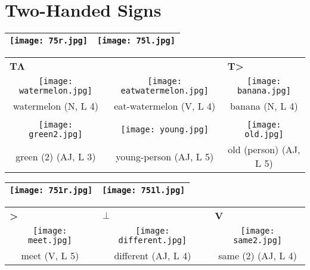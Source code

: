 \documentclass{tufte-book}
\newcommand{\sansnormal}{\sffamily\selectfont}
\begin{document}
\begin{fullwidth}
\begin{table}[h!]
\begin{tabular}{!{\vrule width 3pt}l | l| c!{\vrule width 3pt} l | l| c!{\vrule width 3pt} l|l|c!{\vrule width 3pt}}
\end{tabular}
\end{table}


\newpage
\section{Two-Handed Signs}
\label{page:begintwohand}%

\begin{table}[h!]
\begin{tabular}{|c|c|}
\hline
\texttt{[image: 75r.jpg]} & \texttt{[image: 75l.jpg]}\\
\hline
\end{tabular}
\label{page:75}
\end{table}

 \begin{table*}[h!]
\begin{tabular}{ccc}
 \multicolumn{1}{l}{\textbf{\sansnormal T}$\mathbf\Lambda$}&&\multicolumn{1}{l}{\textbf{{\sansnormal T}>}}  \\
   \texttt{[image: watermelon.jpg]}& \texttt{[image: eatwatermelon.jpg]}&  \texttt{[image: banana.jpg]}\\
   watermelon (N, L 4) & eat-watermelon (V, L 4)& banana (N, L 4)\\%
   \multicolumn{3}{l}{}\\
     \texttt{[image: green2.jpg]}& \texttt{[image: young.jpg]}&  \texttt{[image: old.jpg]}\\
   green (2) (AJ, L 3) & young-person (AJ, L 5)& old (person) (AJ, L 5)\\
  \end{tabular}
\end{table*}

\begin{table}[h!]
\begin{tabular}{|c|c|}
\hline
\texttt{[image: 751r.jpg]} & \texttt{[image: 751l.jpg]}\\
\hline
\end{tabular}
\label{page:751}
\end{table}

 \begin{table*}[h!]
\begin{tabular}{ccc}
 \multicolumn{1}{l}{\textbf{>}}&\multicolumn{1}{l}{$\pmb\perp$}&\multicolumn{1}{l}{\textbf{{\sansnormal V}}}  \\
   \texttt{[image: meet.jpg]}& \texttt{[image: different.jpg]}&  \texttt{[image: same2.jpg]}\\
   meet (V, L 5) & different (AJ, L 4)& same (2) (AJ, L 4)\\%
  

\end{tabular}
\end{table*}
\end{fullwidth}
\end{document}
